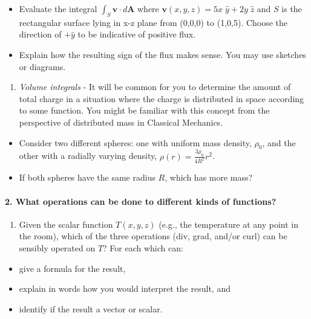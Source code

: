 \documentclass[
  letterpaperpaper,
]{article}
\providecommand{\tightlist}{%
  \setlength{\itemsep}{0pt}\setlength{\parskip}{0pt}}
\begin{document}
\begin{itemize}
\tightlist
\item
  Evaluate the integral \(\int_S \mathbf{v}\cdot d\mathbf{A}\) where
  \(\mathbf{v}(x,y,z) = 5x\;\hat{y} + 2y\;\hat{z}\) and \(S\) is the
  rectangular surface lying in x-z plane from (0,0,0) to (1,0,5). Choose
  the direction of \(+\hat{y}\) to be indicative of positive flux.
\item
  Explain how the resulting sign of the flux makes sense. You may use
  sketches or diagrams.
\end{itemize}

\begin{enumerate}
\def\labelenumi{\arabic{enumi}.}
\setcounter{enumi}{2}
\tightlist
\item
  \emph{Volume integrals} - It will be common for you to determine the
  amount of total charge in a situation where the charge is distributed
  in space according to some function. You might be familiar with this
  concept from the perspective of distributed mass in Classical
  Mechanics.
\end{enumerate}

\begin{itemize}
\tightlist
\item
  Consider two different spheres: one with uniform mass density,
  \(\rho_0\), and the other with a radially varying density,
  \(\rho(r)=\frac{3\rho_0}{4R^2}r^2\).
\item
  If both spheres have the same radius \(R\), which has more mass?
\end{itemize}

\hypertarget{what-operations-can-be-done-to-different-kinds-of-functions}{%
\paragraph{2. What operations can be done to different kinds of
functions?}\label{what-operations-can-be-done-to-different-kinds-of-functions}}

\begin{enumerate}
\def\labelenumi{\arabic{enumi}.}
\tightlist
\item
  Given the scalar function \(T(x,y,z)\) (e.g., the temperature at any
  point in the room), which of the three operations (div, grad, and/or
  curl) can be sensibly operated on \(T\)? For each which can:
\end{enumerate}

\begin{itemize}
\tightlist
\item
  give a formula for the result,
\item
  explain in words how you would interpret the result, and
\item
  identify if the result a vector or scalar.
\end{itemize}
\end{document}
